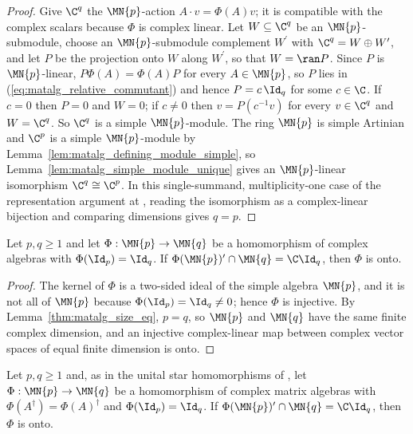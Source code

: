 \begin{proof}\leanok
    Give $\C^q$ the $\MN{p}$-action $A\cdot v=\Phi(A)v$; it is compatible
    with the complex scalars because $\Phi$ is complex linear.  Let
    $W\subseteq\C^q$ be an $\MN{p}$-submodule, choose an $\MN{p}$-submodule
    complement $W^{\prime}$ with $\C^q=W\oplus W^{\prime}$, and let $P$ be
    the projection onto $W$ along $W^{\prime}$, so that $W=\ran P$.  Since
    $P$ is
    $\MN{p}$-linear, $P\Phi(A)=\Phi(A)P$ for every $A\in\MN{p}$, so $P$
    lies in (\ref{eq:matalg_relative_commutant}) and hence $P=c\,\Id_q$ for
    some $c\in\C$.  If $c=0$ then $P=0$ and $W=0$; if $c\neq0$ then
    $v=P(c^{-1}v)$ for every $v\in\C^q$ and $W=\C^q$.  So $\C^q$ is a
    simple $\MN{p}$-module.  The ring $\MN{p}$ is simple Artinian and
    $\C^p$ is a simple $\MN{p}$-module by
    Lemma~\ref{lem:matalg_defining_module_simple}, so
    Lemma~\ref{lem:matalg_simple_module_unique} gives an $\MN{p}$-linear
    isomorphism $\C^q\cong\C^p$.  In this single-summand, multiplicity-one
    case of the representation argument at
    \cite[lines~2101--2116]{SchumacherWerner2004QCA}, reading the
    isomorphism as a complex-linear bijection and comparing dimensions gives
    $q=p$.
\end{proof}

\begin{lemma}
    \label{thm:matalg_surjective_of_scalar_relative_commutant}
    \leanok
    Let $p,q\geq1$ and let $\Phi:\MN{p}\to\MN{q}$ be a homomorphism of
    complex algebras with $\Phi(\Id_p)=\Id_q$.  If
    $\Phi(\MN{p})^{\prime}\cap\MN{q}=\C\Id_q$, then $\Phi$ is onto.
\end{lemma}

\begin{proof}\leanok
    The kernel of $\Phi$ is a two-sided ideal of the simple algebra
    $\MN{p}$, and it is not all of $\MN{p}$ because
    $\Phi(\Id_p)=\Id_q\neq0$; hence $\Phi$ is injective.  By
    Lemma~\ref{thm:matalg_size_eq}, $p=q$, so $\MN{p}$ and $\MN{q}$ have
    the same finite complex dimension, and an injective complex-linear map
    between complex vector spaces of equal finite dimension is onto.
\end{proof}

\begin{lemma}
    \label{thm:matalg_surjective_star}
    \leanok
    Let $p,q\geq1$ and, as in the unital star homomorphisms of
    \cite[lines~2101--2105]{SchumacherWerner2004QCA}, let
    $\Phi:\MN{p}\to\MN{q}$ be a homomorphism of complex matrix algebras with
    $\Phi(A^\dagger)=\Phi(A)^\dagger$ and $\Phi(\Id_p)=\Id_q$.  If
    $\Phi(\MN{p})^{\prime}\cap\MN{q}=\C\Id_q$, then $\Phi$ is onto.
\end{lemma}

